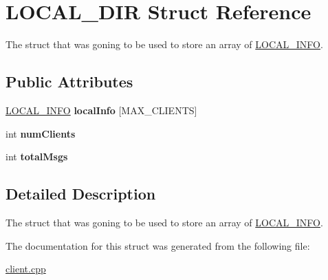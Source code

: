 \hypertarget{structLOCAL__DIR}{
\section{LOCAL\_\-DIR Struct Reference}
\label{structLOCAL__DIR}
}


The struct that was goning to be used to store an array of \hyperlink{structLOCAL__INFO}{LOCAL\_\-INFO}.  
\subsection*{Public Attributes}
\begin{DoxyCompactItemize}
\item 
\hypertarget{structLOCAL__DIR_aa3e290065fd7020e89357bb0864b6225}{
\hyperlink{structLOCAL__INFO}{LOCAL\_\-INFO} {\bfseries localInfo} \mbox{[}MAX\_\-CLIENTS\mbox{]}}
\label{structLOCAL__DIR_aa3e290065fd7020e89357bb0864b6225}

\item 
\hypertarget{structLOCAL__DIR_ab3d38050e1b1595a2d7722b3429a71ef}{
int {\bfseries numClients}}
\label{structLOCAL__DIR_ab3d38050e1b1595a2d7722b3429a71ef}

\item 
\hypertarget{structLOCAL__DIR_a7b6fc663de7fb68253bbff3496243d99}{
int {\bfseries totalMsgs}}
\label{structLOCAL__DIR_a7b6fc663de7fb68253bbff3496243d99}

\end{DoxyCompactItemize}


\subsection{Detailed Description}
The struct that was goning to be used to store an array of \hyperlink{structLOCAL__INFO}{LOCAL\_\-INFO}. 

The documentation for this struct was generated from the following file:\begin{DoxyCompactItemize}
\item 
\hyperlink{client_8cpp}{client.cpp}\end{DoxyCompactItemize}
